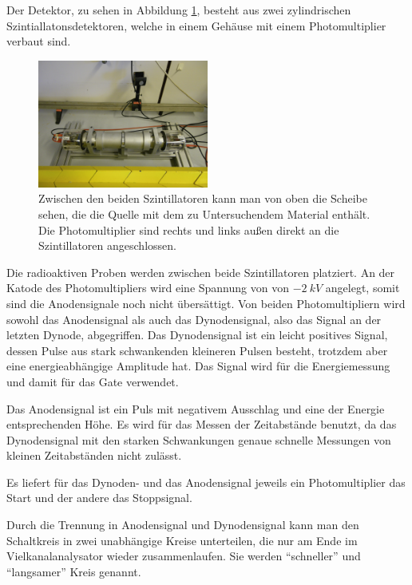 \documentclass[a4paper,12pt]{article}
\begin{document}
Der Detektor, zu sehen in Abbildung \ref{fig:quelle},  besteht aus zwei zylindrischen Szintiallatonsdetektoren,
welche in einem Gehäuse mit einem Photomultiplier verbaut sind.
\begin{figure}[htb]
		\centering
		\includegraphics[width=0.5\textwidth]{quelle2.jpg}
		\caption{Zwischen den beiden Szintillatoren kann man von oben die Scheibe sehen, die die
		Quelle mit dem zu Untersuchendem Material enthält. Die Photomultiplier sind rechts und links
		außen direkt an die Szintillatoren angeschlossen.}
		\label{fig:quelle}
\end{figure}

Die radioaktiven Proben werden zwischen beide Szintillatoren platziert.
An der Katode des Photomultipliers wird  eine Spannung von von $\SI{-2}{kV}$ angelegt,
somit sind die Anodensignale noch nicht übersättigt.
Von beiden Photomultipliern wird sowohl das Anodensignal als auch das Dynodensignal, also das Signal an der letzten Dynode, abgegriffen.
Das Dynodensignal ist ein leicht positives Signal, dessen Pulse aus stark schwankenden kleineren
Pulsen besteht, trotzdem aber eine energieabhängige Amplitude hat.
Das Signal wird für die Energiemessung und damit für das Gate verwendet.

Das Anodensignal ist ein Puls mit negativem Ausschlag und eine der Energie entsprechenden Höhe.
Es wird für das Messen der Zeitabstände benutzt, da das Dynodensignal mit den starken Schwankungen genaue schnelle Messungen von kleinen Zeitabständen nicht zulässt.

Es liefert für das Dynoden- und das Anodensignal jeweils ein Photomultiplier das Start und der andere das Stoppsignal.

Durch die Trennung in Anodensignal und Dynodensignal kann man den Schaltkreis in zwei unabhängige
Kreise unterteilen, die nur am Ende im Vielkanalanalysator wieder zusammenlaufen.
Sie werden "`schneller"' und "`langsamer"' Kreis genannt.
\end{document}
